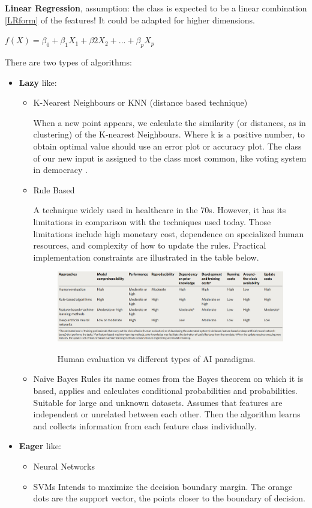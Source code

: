  \textbf{Linear Regression}, assumption: the class is expected to be a linear combination \ref{LRform} of the features!  It could be adapted for higher dimensions.  
 
 $f(X)=\beta_{0}+\beta_{1}X_{1}+\beta{2}X_{2}+...+\beta_{p}X_{p}$ \label{LRform}
 
 \espaco
 

There are two types of algorithms:
\begin{itemize}
    \item \textbf{Lazy} like:
\begin{itemize}
\item  K-Nearest Neighbours or KNN  (distance based technique)

When a new point appears, we calculate the similarity (or distances, as in clustering) of the K-nearest Neighbours. Where k is a positive number, to obtain optimal value should use an error plot or accuracy plot.
The class of our new input is assigned to the class most common, like voting system in democracy \citet{MULLER2019145}.

\item Rule Based


A technique widely used in healthcare in the 70s. However, it has its limitations in comparison with the techniques used today. Those limitations include high monetary cost, dependence on specialized human resources, and complexity of how to update the rules. Practical implementation constraints are illustrated in the table below. 


\begin{figure}[ht]
    \centering
    \includegraphics[scale=0.5]{figures/nature.png}
    \caption{Human evaluation vs different types of AI paradigms.}
    \label{fig:Human and AI Approaches}
    \cite{Yu2018}
\end{figure}
\item Naive Bayes Rules 
its name comes from the Bayes theorem on which it is based, applies and calculates conditional probabilities and probabilities. Suitable for large and unknown datasets.
Assumes that features are independent or unrelated between each other. Then the algorithm learns and collects information from each feature class individually.
\end{itemize}
    \item \textbf{Eager} like:
\begin{itemize}
\item Neural Networks
\item SVMs
Intends to maximize the decision boundary margin. The orange dots are the support vector, the points closer to the boundary of decision.


\end{itemize}
\end{itemize}

